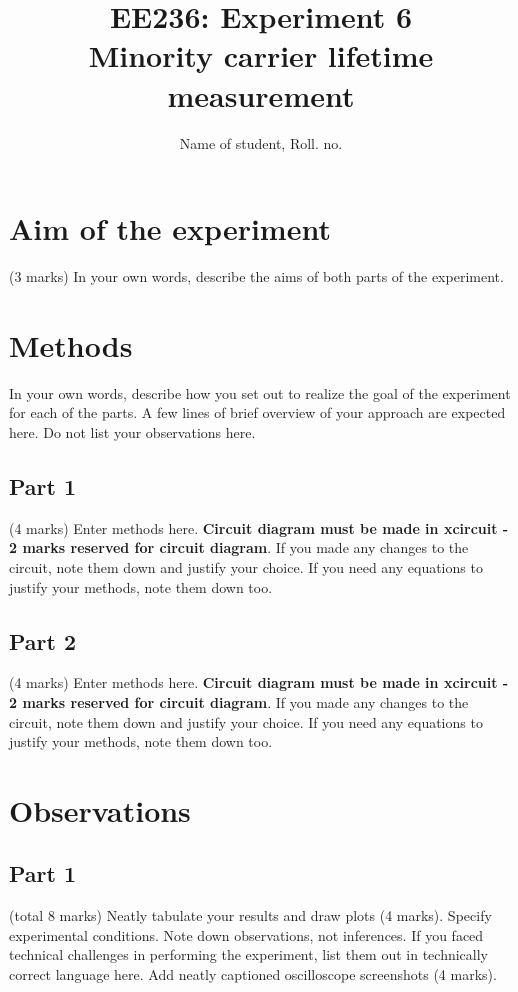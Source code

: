 \documentclass[12pt]{article}
\title{EE236: Experiment 6\\
Minority carrier lifetime measurement}
\author{Name of student, Roll. no.}
\begin{document}
\maketitle

\section{Aim of the experiment}

(3 marks) In your own words, describe the aims of both parts of the experiment.

\section{Methods}

In your own words, describe how you set out to realize the goal of the experiment for each of the parts. A few lines of brief overview of your approach are expected here. Do not list your observations here.

\subsection{Part 1}

(4 marks) Enter methods here. \textbf{Circuit diagram must be made in xcircuit - 2 marks reserved for circuit diagram}. If you made any changes to the circuit, note them down and justify your choice. If you need any equations to justify your methods, note them down too.

\subsection{Part 2}

(4 marks) Enter methods here. \textbf{Circuit diagram must be made in xcircuit - 2 marks reserved for circuit diagram}. If you made any changes to the circuit, note them down and justify your choice. If you need any equations to justify your methods, note them down too.

\section{Observations}

\subsection{Part 1}

(total 8 marks) Neatly tabulate your results and draw plots (4 marks). Specify experimental conditions. Note down observations, not inferences. If you faced technical challenges in performing the experiment, list them out in technically correct language here. Add neatly captioned oscilloscope screenshots (4 marks).
\end{document}
